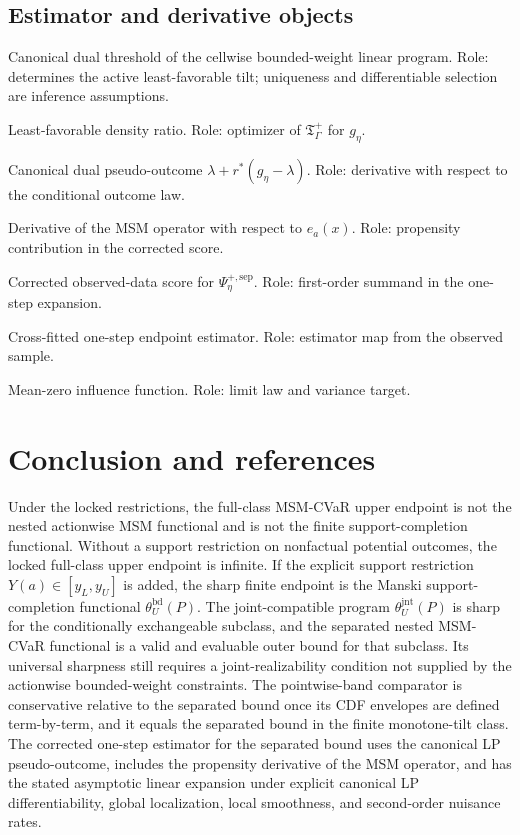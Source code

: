 \documentclass[11pt]{article}
\theoremstyle{definition}
\theoremstyle{plain}
\theoremstyle{remark}
\begin{document}
\subsection*{Estimator and derivative objects}
\begin{description}[leftmargin=4.1cm,style=sameline]
\item[\(\lambda_{\eta,a}(x)\)] Canonical dual threshold of the cellwise
bounded-weight linear program.  Role: determines the active least-favorable
tilt; uniqueness and differentiable selection are inference assumptions.
\item[\(r_{\eta,a}^*(y,x)\)] Least-favorable density ratio.  Role: optimizer of
\(\mathfrak T_\Gamma^+\) for \(g_\eta\).
\item[\(h_{\eta,a}(y,x)\)] Canonical dual pseudo-outcome
\(\lambda+r^*(g_\eta-\lambda)\).  Role: derivative with respect to the
conditional outcome law.
\item[\(\dot T_{\eta,a,e}(x)\)] Derivative of the MSM operator with respect to
\(e_a(x)\).  Role: propensity contribution in the corrected score.
\item[\(\chi_{\eta,\pi}(O)\)] Corrected observed-data score for
\(\Psi_\eta^{+,\mathrm{sep}}\).  Role: first-order summand in the one-step
expansion.
\item[\(\widehat W_{\tau,\Gamma}^{\mathrm{sep}}(\pi)\)] Cross-fitted one-step
endpoint estimator.  Role: estimator map from the observed sample.
\item[\(\varphi_{\tau,\Gamma,\pi}^{\mathrm{sep}}\)] Mean-zero influence
function.  Role: limit law and variance target.
\end{description}

\section{Conclusion and references}
Under the locked restrictions, the full-class MSM-CVaR upper endpoint is not the
nested actionwise MSM functional and is not the finite support-completion
functional.  Without a support restriction on nonfactual potential outcomes, the
locked full-class upper endpoint is infinite.  If the explicit support
restriction \(Y(a)\in[y_L,y_U]\) is added, the sharp finite endpoint is the
Manski support-completion functional \(\theta_U^{\mathrm{bd}}(P)\).  The
joint-compatible program \(\theta_U^{\mathrm{jnt}}(P)\) is sharp for the
conditionally exchangeable subclass, and the separated nested MSM-CVaR
functional is a valid and evaluable outer bound for that subclass.  Its
universal sharpness still requires a joint-realizability condition not supplied
by the actionwise bounded-weight constraints.  The pointwise-band comparator is
conservative relative to the separated bound once its CDF envelopes are defined
term-by-term, and it equals the separated bound in the finite monotone-tilt
class.  The corrected one-step estimator for the separated bound uses the
canonical LP pseudo-outcome, includes the propensity derivative of the MSM
operator, and has the stated asymptotic linear expansion under explicit
canonical LP differentiability, global localization, local smoothness, and
second-order nuisance rates.
\end{document}
